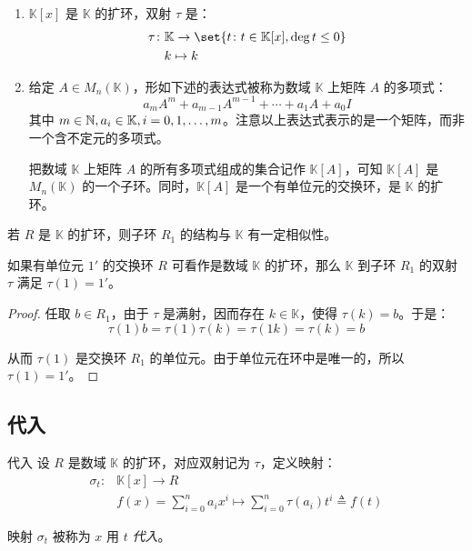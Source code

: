 \begin{example}
	\begin{enumerate}
		\item $\mathbb K[x]$ 是 $\mathbb K$ 的扩环，双射 $\tau$ 是：
		$$
		\begin{aligned}
			\tau \colon & \mathbb K \to \set{t \colon t \in \mathbb K[x], \deg t \le 0}
			\\&
			k \mapsto k
		\end{aligned}
		$$

		\item 给定 $A \in M_n(\mathbb K)$，形如下述的表达式被称为数域 $\mathbb K$ 上矩阵 $A$ 的多项式：
		$$
		a_m A^m + a_{m - 1} A^{m - 1} + \cdots + a_1 A + a_0 I
		$$
		其中 $m \in \mathbb N, a_i \in \mathbb K, i = 0, 1, \ldots, m$。注意以上表达式表示的是一个矩阵，而非一个含不定元的多项式。

		把数域 $\mathbb K$ 上矩阵 $A$ 的所有多项式组成的集合记作 $\mathbb K[A]$，可知 $\mathbb K[A]$ 是 $M_n(\mathbb K)$ 的一个子环。同时，$\mathbb K[A]$ 是一个有单位元的交换环，是 $\mathbb K$ 的扩环。
	\end{enumerate}
\end{example}

若 $R$ 是 $\mathbb K$ 的扩环，则子环 $R_1$ 的结构与 $\mathbb K$ 有一定相似性。

\begin{proposition}
	如果有单位元 $1'$ 的交换环 $R$ 可看作是数域 $\mathbb K$ 的扩环，那么 $\mathbb K$ 到子环 $R_1$ 的双射 $\tau$ 满足 $\tau(1) = 1'$。
\end{proposition}

\begin{proof}
	任取 $b \in R_1$，由于 $\tau$ 是满射，因而存在 $k \in \mathbb K$，使得 $\tau(k) = b$。于是：\
	$$
	\tau(1) b = \tau(1) \tau(k) = \tau(1k) = \tau(k) = b
	$$

	从而 $\tau(1)$ 是交换环 $R_1$ 的单位元。由于单位元在环中是唯一的，所以 $\tau(1) = 1'$。
\end{proof}

\subsection{代入}

\begin{definition}{代入}
	设 $R$ 是数域 $\mathbb K$ 的扩环，对应双射记为 $\tau$，定义映射：\
	$$
	\begin{aligned}
		\sigma_t \colon & \mathbb K[x] \to R
		\\&
		f(x) = \sum\limits_{i = 0}^n a_i x^i \mapsto \sum\limits_{i = 0}^n \tau(a_i) t^i \triangleq f(t)
	\end{aligned}
	$$

	映射 $\sigma_t$ 被称为 $x$ 用 $t$ \emph{代入}。
\end{definition}

